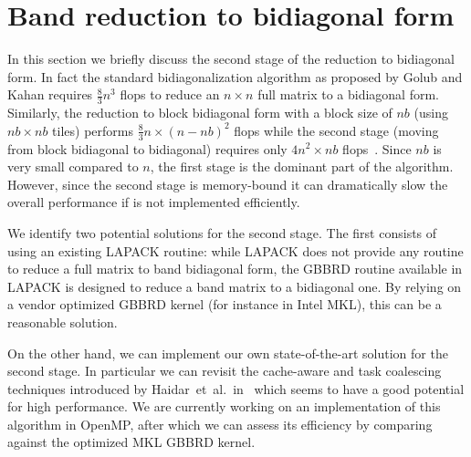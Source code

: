 \section{Band reduction to bidiagonal form}\label{sec:bidiag}
In this section we briefly discuss the second stage of the reduction
to bidiagonal form.
In fact the standard bidiagonalization
algorithm as proposed by Golub and Kahan requires $\frac{8}{3}n^3$
flops to reduce an $n \times n$ full matrix to a bidiagonal form.
Similarly, the reduction to block bidiagonal form with a
block size of $nb$ (using $nb \times nb$ tiles) performs
$\frac{8}{3} n\times (n-nb)^2$ flops while the second stage
(moving from block bidiagonal to bidiagonal)
requires only $4 n^2\times nb$ flops~\cite{ltaief2013high}.
Since $nb$ is very small compared to $n$,
the first stage is the dominant part of the algorithm.
However,
since the second stage is memory-bound it can dramatically slow the
overall performance if is not implemented efficiently.

We identify two potential solutions for the second stage.
The first consists of using an existing LAPACK routine:
while LAPACK does not provide any routine to reduce a
full matrix to band bidiagonal form,
the GBBRD routine available in LAPACK is designed to
reduce a band matrix to a bidiagonal one.
By relying on a vendor optimized GBBRD kernel
(for instance in Intel MKL), this can be a reasonable solution.

On the other hand, we can implement our own state-of-the-art
solution for the second stage.
In particular we can revisit the cache-aware
and task coalescing techniques introduced by
Haidar~et~al\@.~in~\cite{haidar2011parallel}
which seems to have a good potential for high performance.
We are currently working on an implementation of this
algorithm in OpenMP,
after which we can assess its efficiency by
comparing against the optimized MKL GBBRD kernel.
